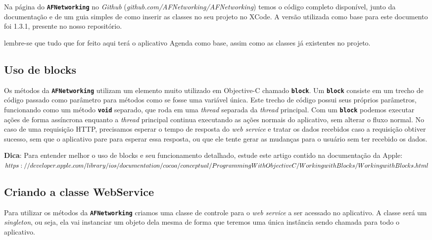 \documentclass[a4paper,12pt,brazil,doubleside]{book}
\begin{document}
\begin{singlespace}
Na página do \texttt{\textbf{AFNetworking}} no \emph{Github} (\textit{github.com/AFNetworking/AFNetworking}) temos o código completo disponível, junto da documentação e de um guia simples de como inserir as classes no seu projeto no XCode. A versão utilizada como base para este documento foi 1.3.1, presente no nosso repositório.

lembre-se que tudo que for feito aqui terá o aplicativo Agenda como base, assim como as classes já existentes no projeto.

\subsection{Uso de blocks}


Os métodos da \texttt{\textbf{AFNetworking}} utilizam um elemento muito utilizado em Objective-C chamado \texttt{\textbf{block}}. Um \texttt{\textbf{block}} consiste em um trecho de código passado como parâmetro para métodos como se fosse uma variável única. Este trecho de código possui seus próprios parâmetros, funcionando como um método \texttt{\textbf{void}} separado, que roda em uma \emph{thread} separada da \emph{thread} principal. Com um \texttt{\textbf{block}} podemos executar ações de forma assíncrona enquanto a \emph{thread} principal continua executando as ações normais do aplicativo, sem alterar o fluxo normal. No caso de uma requisição HTTP, precisamos esperar o tempo de resposta do \emph{web service} e tratar os dados recebidos caso a requisição obtiver sucesso, sem que o aplicativo pare para esperar essa resposta, ou que ele tente gerar as mudanças para o usuário sem ter recebido os dados.

\begin{framed}

\textbf{Dica}:  Para entender melhor o uso de blocks e seu funcionamento detalhado, estude este artigo contido na documentação da Apple:\\
\(https://developer.apple.com/library/ios/documentation/cocoa/conceptual/\\ProgrammingWithObjectiveC/WorkingwithBlocks/WorkingwithBlocks.html\)
\end{framed}

\subsection{Criando a classe WebService}


Para utilizar os métodos da \texttt{\textbf{AFNetworking}} criamos uma classe de controle para o \emph{web service} a ser acessado no aplicativo. A classe será um \emph{singleton}, ou seja, ela vai instanciar um objeto dela mesma de forma que teremos uma única instância sendo chamada para todo o aplicativo.


\end{singlespace}
\end{document}
